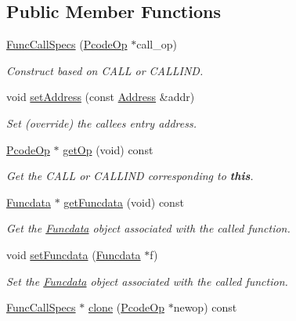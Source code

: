 \subsection*{Public Member Functions}
\begin{DoxyCompactItemize}
\item 
\mbox{\hyperlink{class_func_call_specs_a96cbd6a1b0311883aeb840f47e4a0ec7}{Func\+Call\+Specs}} (\mbox{\hyperlink{class_pcode_op}{Pcode\+Op}} $\ast$call\+\_\+op)
\begin{DoxyCompactList}\small\item\em Construct based on C\+A\+LL or C\+A\+L\+L\+I\+ND. \end{DoxyCompactList}\item 
void \mbox{\hyperlink{class_func_call_specs_a9dbc2ae7d43e62971751d96cbddf1b32}{set\+Address}} (const \mbox{\hyperlink{class_address}{Address}} \&addr)
\begin{DoxyCompactList}\small\item\em Set (override) the callee\textquotesingle{}s entry address. \end{DoxyCompactList}\item 
\mbox{\hyperlink{class_pcode_op}{Pcode\+Op}} $\ast$ \mbox{\hyperlink{class_func_call_specs_ad88ee3058ece9a8b19f4e25566c03121}{get\+Op}} (void) const
\begin{DoxyCompactList}\small\item\em Get the C\+A\+LL or C\+A\+L\+L\+I\+ND corresponding to {\bfseries{this}}. \end{DoxyCompactList}\item 
\mbox{\hyperlink{class_funcdata}{Funcdata}} $\ast$ \mbox{\hyperlink{class_func_call_specs_a860b42c7f272e40dae078854e101b6bc}{get\+Funcdata}} (void) const
\begin{DoxyCompactList}\small\item\em Get the \mbox{\hyperlink{class_funcdata}{Funcdata}} object associated with the called function. \end{DoxyCompactList}\item 
void \mbox{\hyperlink{class_func_call_specs_ae2f63fcf31daa5cc5663df227a813f0a}{set\+Funcdata}} (\mbox{\hyperlink{class_funcdata}{Funcdata}} $\ast$f)
\begin{DoxyCompactList}\small\item\em Set the \mbox{\hyperlink{class_funcdata}{Funcdata}} object associated with the called function. \end{DoxyCompactList}\item 
\mbox{\hyperlink{class_func_call_specs}{Func\+Call\+Specs}} $\ast$ \mbox{\hyperlink{class_func_call_specs_ac649b58eb85cf052096ac32e5ced8607}{clone}} (\mbox{\hyperlink{class_pcode_op}{Pcode\+Op}} $\ast$newop) const

\end{DoxyCompactItemize}
